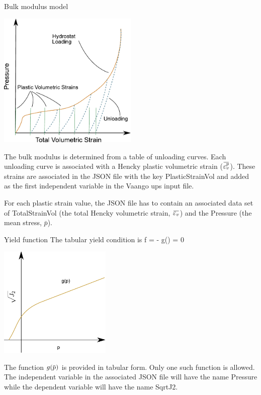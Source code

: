 \begin{SummaryBox}[label=box:TableBulkModulusModel]{Bulk modulus model}
  \begin{center}
    \includegraphics[width=0.5\textwidth]{MPMMaterials/FIGS/TabularHydrostat.pdf}
  \end{center}

  The bulk modulus is determined from a table of unloading curves.  Each unloading 
  curve is associated with a Hencky plastic volumetric strain ($\bar{\Veps_v^p}$).
  These strains are associated in the JSON file with the key \textsf{PlasticStrainVol}
  and added as the first independent variable in the Vaango \textsf{ups} input file.

  For each plastic strain value, the JSON file has to contain an associated data
  set of \textsf{TotalStrainVol} (the total Hencky volumetric strain, $\bar{\Veps_v}$)
  and the \textsf{Pressure} (the mean stress, $\bar{p}$).
\end{SummaryBox}

\begin{SummaryBox}[label=box:TableYieldFunction]{Yield function}
  The tabular yield condition is
  \Beq
     f =  - g(\pbar) = 0
  \Eeq
  \begin{center}
    \includegraphics[width=0.4\textwidth]{MPMMaterials/FIGS/TabularYieldFn.pdf}
  \end{center}
  The function $g(\pbar)$ is provided in tabular form.  Only one such function is
  allowed.  The independent variable in the associated JSON file will have the name
  \textsf{Pressure} while the dependent variable will have the name \textsf{SqrtJ2}.
\end{SummaryBox}

